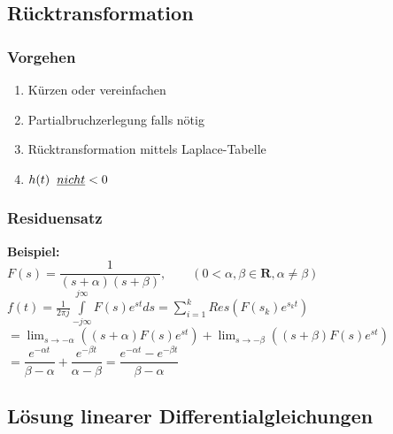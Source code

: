 \newpage
\renewcommand{\arraystretch}{\arraystretchOriginal}		
	\subsection{Rücktransformation }
		\subsubsection{Vorgehen}
			\begin{enumerate}
				\item Kürzen oder vereinfachen
				\item Partialbruchzerlegung falls nötig 
				\item Rücktransformation mittels Laplace-Tabelle
				\item $h(t)\hspace{0.2cm}\underline{nicht} < 0$
			\end{enumerate}
			
		\subsubsection{Residuensatz}
			\textbf{Beispiel:}\\[2mm]
			$F(s) = \dfrac{1}{(s+\alpha)(s+\beta)}, \qquad (0 < \alpha,\beta \in \mathbf{R}, \alpha \neq \beta)$\\[2mm]
			$f(t) = \frac{1}{2\pi j} \int\limits_{-j\infty}^{j\infty} F(s)e^{st} ds = \sum\limits_{i=1}^k Res(F(s_k)e^{s_kt})$\\[2mm]
			$=\lim_{s \to -\alpha} ((s+\alpha)F(s)e^{st}) + \lim_{s \to -\beta}((s+\beta)F(s)e^{st})$\\[2mm]
			$=\dfrac{e^{-\alpha t}}{\beta - \alpha} + \dfrac{e^{-\beta t}}{\alpha - \beta} = \dfrac{e^{-\alpha t}-e^{-\beta t}}{\beta - \alpha}$
			

	
	\subsection{Lösung linearer Differentialgleichungen }
			
